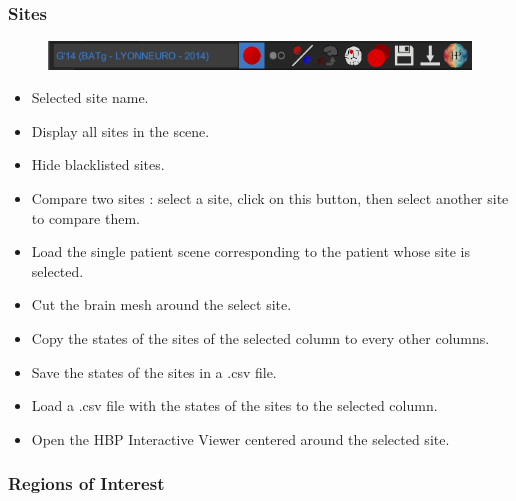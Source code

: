 \documentclass[a4paper]{article}
\begin{document}
\subsubsection{Sites}
\begin{figure}[H]
\begin{center}
\includegraphics[scale=0.45]{Sites.png}
\end{center}
\end{figure}
\begin{itemize}
\item Selected site name.
\item Display all sites in the scene.
\item Hide blacklisted sites.
\item Compare two sites : select a site, click on this button, then select another site to compare them.
\item Load the single patient scene corresponding to the patient whose site is selected.
\item Cut the brain mesh around the select site.
\item Copy the states of the sites of the selected column to every other columns.
\item Save the states of the sites in a .csv file.
\item Load a .csv file with the states of the sites to the selected column.
\item Open the HBP Interactive Viewer centered around the selected site.
\end{itemize}
\subsubsection{Regions of Interest}\label{roi}
\end{document}
